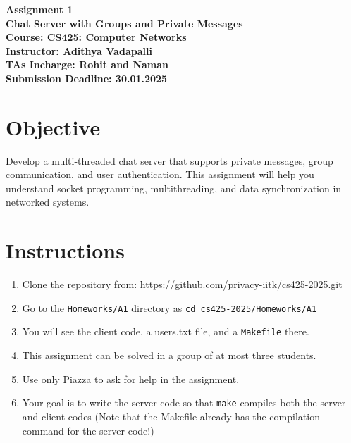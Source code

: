 \documentclass[12pt,a4paper]{article}
\begin{document}
\begin{titlepage}
    \centering
    \vspace{2cm}
    \vspace{1cm}

    {\Huge \textbf{Assignment 1}}\\[1cm]
    {\Large \textbf{Chat Server with Groups and Private Messages}}\\[2cm]

    \textbf{Course: CS425: Computer Networks}\\[0.5cm]
    \textbf{Instructor:  Adithya Vadapalli }\\[0.5cm]
    \textbf{TAs Incharge: Rohit and Naman}\\[3cm]

    \vfill
    \textbf{Submission Deadline: 30.01.2025}\\[0.5cm]
    \vfill

\end{titlepage}

\section*{Objective}
Develop a multi-threaded chat server that supports private messages, group communication, and user authentication. This assignment will help you understand socket programming, multithreading, and data synchronization in networked systems.

\section*{Instructions}
\begin{enumerate}
\item Clone the repository from: \url{https://github.com/privacy-iitk/cs425-2025.git} 
\item Go to the \texttt{Homeworks/A1} directory as \texttt{cd cs425-2025/Homeworks/A1}
\item You will see the client code, a users.txt file, and a \texttt{Makefile} there. 
\item This assignment can be solved in a group of at most three students.
\item Use only Piazza to ask for help in the assignment. 
\item Your goal is to write the server code so that \texttt{make} compiles both the server and client codes (Note that the Makefile already has the compilation command for the server code!)
\end{enumerate}
\end{document}
